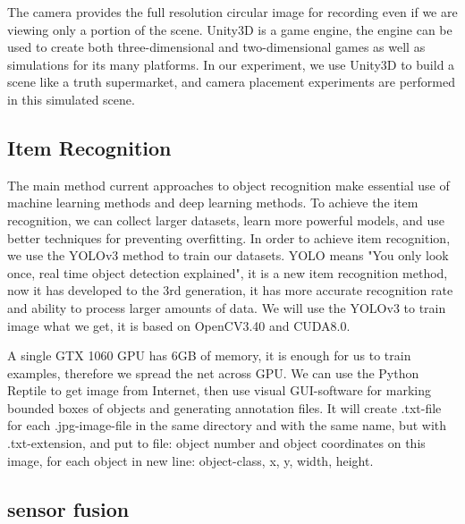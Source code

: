 The camera provides the full resolution circular image for recording even if we are viewing only a portion of the scene.
Unity3D is a game engine, the engine can be used to create both three-dimensional and two-dimensional games as well as simulations for its many platforms.
In our experiment, we use Unity3D to build a scene like a truth supermarket, and camera placement experiments are performed in this simulated scene.

\subsection{Item Recognition}

The main method current approaches to object recognition make essential use of machine learning methods and deep learning methods.
To achieve the item recognition, we can collect larger datasets, learn more powerful models, and use better techniques for preventing overfitting.
In order to achieve item recognition, we use the YOLOv3 method to train our datasets.
YOLO means "You only look once, real time object detection explained", it is a new item recognition method, now it has developed to the 3rd generation, it has more accurate recognition rate and ability to process larger amounts of data.
We will use the YOLOv3 to train image what we get, it is based on OpenCV3.40 and CUDA8.0.

A single GTX 1060 GPU has 6GB of memory, it is enough for us to train examples, therefore we spread the net across GPU.
We can use the Python Reptile to get image from Internet, then use visual GUI-software for marking bounded boxes of objects and generating annotation files.
It will create .txt-file for each .jpg-image-file in the same directory and with the same name, but with .txt-extension, and put to file: object number and object coordinates on this image, for each object in new line: object-class, x, y, width, height.

\subsection{sensor fusion}

